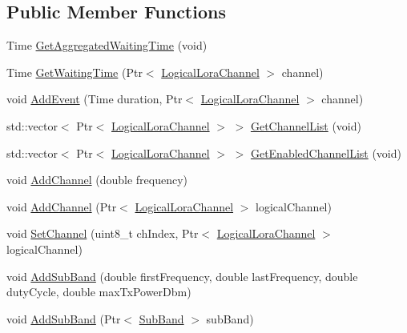 \subsection*{Public Member Functions}
\begin{DoxyCompactItemize}
\item 
Time \hyperlink{classns3_1_1lorawan_1_1LogicalLoraChannelHelper_a532db364466139b87e62c07cb2a85414}{Get\+Aggregated\+Waiting\+Time} (void)
\item 
Time \hyperlink{classns3_1_1lorawan_1_1LogicalLoraChannelHelper_ae4467bd31813cf74dcac7f4990f5aa15}{Get\+Waiting\+Time} (Ptr$<$ \hyperlink{classns3_1_1lorawan_1_1LogicalLoraChannel}{Logical\+Lora\+Channel} $>$ channel)
\item 
void \hyperlink{classns3_1_1lorawan_1_1LogicalLoraChannelHelper_ae48a646b236962de394678f054d5fc7b}{Add\+Event} (Time duration, Ptr$<$ \hyperlink{classns3_1_1lorawan_1_1LogicalLoraChannel}{Logical\+Lora\+Channel} $>$ channel)
\item 
std\+::vector$<$ Ptr$<$ \hyperlink{classns3_1_1lorawan_1_1LogicalLoraChannel}{Logical\+Lora\+Channel} $>$ $>$ \hyperlink{classns3_1_1lorawan_1_1LogicalLoraChannelHelper_ac6acb9dfa7eb69194cf8cb132da82cb8}{Get\+Channel\+List} (void)
\item 
std\+::vector$<$ Ptr$<$ \hyperlink{classns3_1_1lorawan_1_1LogicalLoraChannel}{Logical\+Lora\+Channel} $>$ $>$ \hyperlink{classns3_1_1lorawan_1_1LogicalLoraChannelHelper_a34579c38bec6daf87b36ee2fd03ee7b0}{Get\+Enabled\+Channel\+List} (void)
\item 
void \hyperlink{classns3_1_1lorawan_1_1LogicalLoraChannelHelper_afa7c819db1b7058d70ea9b119c5b66fb}{Add\+Channel} (double frequency)
\item 
void \hyperlink{classns3_1_1lorawan_1_1LogicalLoraChannelHelper_a187f2f1d16bf4df99f59bcbb06cacf2c}{Add\+Channel} (Ptr$<$ \hyperlink{classns3_1_1lorawan_1_1LogicalLoraChannel}{Logical\+Lora\+Channel} $>$ logical\+Channel)
\item 
void \hyperlink{classns3_1_1lorawan_1_1LogicalLoraChannelHelper_a2d697320e188aba516348388b9d9e652}{Set\+Channel} (uint8\+\_\+t ch\+Index, Ptr$<$ \hyperlink{classns3_1_1lorawan_1_1LogicalLoraChannel}{Logical\+Lora\+Channel} $>$ logical\+Channel)
\item 
void \hyperlink{classns3_1_1lorawan_1_1LogicalLoraChannelHelper_ad9e5112354a7fd98202a33b1fc936c83}{Add\+Sub\+Band} (double first\+Frequency, double last\+Frequency, double duty\+Cycle, double max\+Tx\+Power\+Dbm)
\item 
void \hyperlink{classns3_1_1lorawan_1_1LogicalLoraChannelHelper_aed46cc970a58e82b7a2943f4fc9ad65e}{Add\+Sub\+Band} (Ptr$<$ \hyperlink{classns3_1_1lorawan_1_1SubBand}{Sub\+Band} $>$ sub\+Band)

\end{DoxyCompactItemize}
